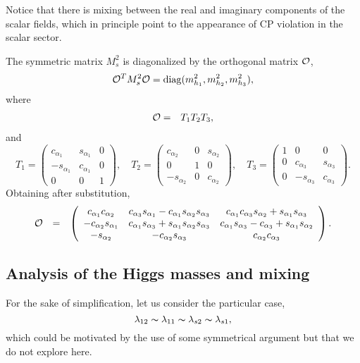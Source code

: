 \documentclass[aps,prd,groupaddress,floatfix,tighten,nofootinbib,showpacs,
amsfonts,superscriptaddress]{revtex4}
\def\be{\begin{equation}}
\def\ee{\end{equation}}
\begin{document}
Notice that there is mixing between the real and imaginary components of the scalar fields, which in principle point to the appearance of CP violation in the scalar sector.

The symmetric matrix $M^2_s$ is diagonalized by the orthogonal matrix ${\cal O}$,
%
\be
\label{diagonal}
{\cal O}^T M^2_s {\cal O} = \mathrm{diag}(m_{h_1}^2,m_{h_2}^2,m_{h_3}^2) ,
\ee
%
where
%
\begin{eqnarray}
{\cal O} &=& T_1 T_2 T_3 ,
\end{eqnarray}
%
and
% 
\be
\label{eq:tmatrix}
T_1 = \left(
\begin{array}{ccc}
 c_{\alpha_1} & s_{\alpha_1} & 0 \\
 -s_{\alpha_1} & c_{\alpha_1} & 0 \\
0 & 0 & 1
\end{array} \right),
\quad
T_2 = \left(
\begin{array}{ccc}
 c_{\alpha_2} & 0 & s_{\alpha_2}  \\
 0 & 1 & 0 \\
 -s_{\alpha_2}& 0 & c_{\alpha_2}  
\end{array} \right),
\quad
T_3 = \left(
\begin{array}{ccc}
1 & 0 & 0 \\
0 & c_{\alpha_3}&  s_{\alpha_3}  \\
0 & -s_{\alpha_3}&  c_{\alpha_3}  
\end{array} \right).
\ee
%
Obtaining after substitution,
%
\be
\label{eq:ortogonalmatrix}
\begin{array}{rcl}
{\cal O}
&=&  \left(
\begin{array}{ccc}
c_{\alpha_1}c_{\alpha_2} & c_{\alpha_3} s_{\alpha_1} - c_{\alpha_1} s_{\alpha_2} s_{\alpha_3} & c_{\alpha_1} c_{\alpha_3} s_{\alpha_2}+ s_{\alpha_1} s_{\alpha_3} \\
-c_{\alpha_2}s_{\alpha_1} & c_{\alpha_1} s_{\alpha_3} + s_{\alpha_1} s_{\alpha_2} s_{\alpha_3} & c_{\alpha_1} s_{\alpha_3} - c_{\alpha_3}+ s_{\alpha_1} s_{\alpha_2} \\
-s_{\alpha_2} & -c_{\alpha_2} s_{\alpha_3}  & c_{\alpha_2} c_{\alpha_3} 
\end{array} \right) .
\end{array}
\ee
%
\subsection{Analysis of the Higgs masses and mixing\label{subsec:analhiggsmassmix}}
For the sake of simplification, let us consider the particular case,
%
\be
\lambda_{12} \thicksim \lambda_{11} \thicksim  \lambda_{s2} \thicksim \lambda_{s1},
\label{eq:particularcase}
\ee
%
which could be motivated by the use of some symmetrical argument but that we do not explore here.
\end{document}
